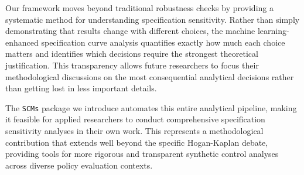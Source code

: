 Our framework moves beyond traditional robustness checks by providing a systematic method for understanding specification sensitivity. Rather than simply demonstrating that results change with different choices, the machine learning-enhanced specification curve analysis quantifies exactly how much each choice matters and identifies which decisions require the strongest theoretical justification. This transparency allows future researchers to focus their methodological discussions on the most consequential analytical decisions rather than getting lost in less important details.

The \texttt{SCMs} package we introduce automates this entire analytical pipeline, making it feasible for applied researchers to conduct comprehensive specification sensitivity analyses in their own work. This represents a methodological contribution that extends well beyond the specific Hogan-Kaplan debate, providing tools for more rigorous and transparent synthetic control analyses across diverse policy evaluation contexts.